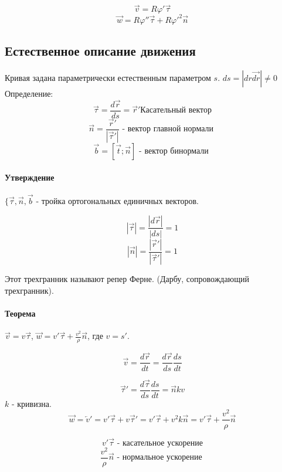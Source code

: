 \documentclass{article}
\begin{document}
  $$ \overrightarrow{v} = R\varphi' \overrightarrow{\tau} $$
  $$ \overrightarrow{w} = R \varphi'' \overrightarrow{\tau} + R \varphi'^2 \overrightarrow{n} $$
  
  \subsection*{Естественное описание движения}
  Кривая задана параметрически естественным параметром $s$. $ ds = |dr\overrightarrow{dr}| \neq 0 $
  Определение: 
  $$ \overrightarrow{\tau} = \frac{d\overrightarrow{r}}{ds} = \overrightarrow{r}' \text{Касательный вектор} $$
  $$ \overrightarrow{n} = \frac{\overrightarrow{r}'}{|\overrightarrow{\tau}'|} \text{ - вектор главной нормали }$$
  $$ \overrightarrow{b} = [\overrightarrow{t}; \overrightarrow{n}] \text{ - вектор бинормали }$$

  \paragraph{Утверждение} $ \{\overrightarrow{\tau}, \overrightarrow{n}, \overrightarrow{b} $ - тройка ортогональных единичных векторов.
  
  $$ |\overrightarrow{\tau}| = \frac{|d\overrightarrow{r}|}{|ds|} = 1 $$
  $$ |\overrightarrow{n}| = \frac{|\overrightarrow{r}'|}{|\overrightarrow{\tau}'|} = 1 $$
  
  Этот трехгранник называют репер Ферне. (Дарбу, сопровождающий трехгранник).
  
  \paragraph{Теорема} $ \overrightarrow{v} = v \overrightarrow{\tau} $, $ \overrightarrow{w} = v' \overrightarrow{\tau} + \frac{v^2}{\rho} \overrightarrow{n} $, где $ v = s' $.
  
  $$ \overrightarrow{v} = \frac{d\overrightarrow{r}}{dt} = \frac{d\overrightarrow{r}}{ds} \frac{ds}{dt} $$
  
  $$ \overrightarrow{\tau}' = \frac{d\overrightarrow{\tau}}{ds} \frac{ds}{dt} = \overrightarrow{n}kv $$
  $k$ - кривизна.
  $$ \overrightarrow{w} = \overleftarrow{v}' = v' \overrightarrow{\tau} + v \overrightarrow{\tau}' = v' \overrightarrow{\tau} + v^2 k \overrightarrow{n} = v' \overrightarrow{\tau} + \frac{v^2}{\rho} \overrightarrow{n} $$
  
  $$ v' \overrightarrow{\tau} \text{ - касательное ускорение} $$
  $$ \frac{v^2}{\rho} \overrightarrow{n} \text{ - нормальное ускорение } $$
  
\end{document}
